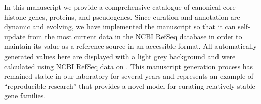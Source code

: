     In this manuscript we provide a comprehensive catalogue
    of canonical core histone genes, proteins, and pseudogenes.
    Since curation and annotation are dynamic and evolving,
    we have implemented the manuscript so that it can
    self-update from the most current data in the NCBI RefSeq database
    in order to maintain its value as a reference source in an accessible format.
    All automatically generated values here are displayed with a light grey background
    and were calculated using NCBI RefSeq data on \printdate{\SequencesDate{}}.
    This manuscript generation process has remained stable in our laboratory for several years
    and represents an example of ``reproducible research'' \citep{Claerbout2000}
    that provides a novel model for curating relatively stable gene families.
